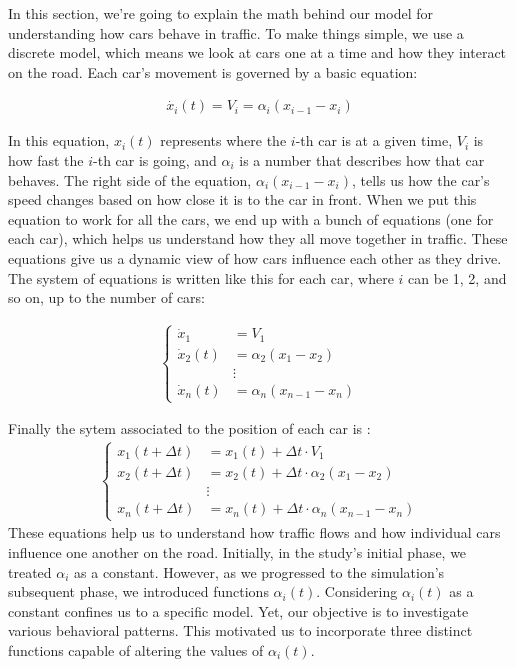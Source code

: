 \documentclass{article}
\begin{document}
			In this section, we're going to explain the math behind our model for understanding how cars behave in traffic. To make things simple, we use a discrete model, which means we look at cars one at a time and how they interact on the road. Each car's movement is governed by a basic equation:
			
			\begin{align*}
				\boxed{\dot{x_i}(t) = V_i = \alpha_i(x_{i-1} - x_i)}
			\end{align*}
			
			In this equation, \(x_i(t)\) represents where the \(i\)-th car is at a given time, \(V_i\) is how fast the \(i\)-th car is going, and \(\alpha_i\) is a number that describes how that car behaves. The right side of the equation, \(\alpha_i(x_{i-1} - x_i)\), tells us how the car's speed changes based on how close it is to the car in front. When we put this equation to work for all the cars, we end up with a bunch of equations (one for each car), which helps us understand how they all move together in traffic. These equations give us a dynamic view of how cars influence each other as they drive. The system of equations is written like this for each car, where \(i\) can be 1, 2, and so on, up to the number of cars:
			
			\begin{align*}
				\left\{
				\begin{array}{ll}
					\dot{x}_1 &= V_1 \\
					\dot{x}_2(t) &= \alpha_2(x_1 - x_2) \\
					&\vdots \\
					\dot{x}_n(t) &= \alpha_n(x_{n-1} - x_n)
				\end{array}
				\right.
			\end{align*}
			
			
			Finally the sytem associated to the position of each car is : 
			\begin{align*}
				\left\{
				\begin{array}{ll}
					x_1(t + \Delta t) &= x_1(t) + \Delta t  \cdot V_1\\
					x_2(t + \Delta t) &= x_2(t) + \Delta t  \cdot \alpha_2(x_1 - x_2) \\
					&\vdots \\
					x_n(t + \Delta t) &= x_n(t) + \Delta t \cdot  \alpha_n(x_{n-1} - x_n)
				\end{array}
				\right.
			\end{align*}
			These equations help us to understand how traffic flows and how individual cars influence one another on the road. Initially, in the study's initial phase, we treated $\alpha_i$ as a constant. However, as we progressed to the simulation's subsequent phase, we introduced functions $\alpha_i(t)$. Considering $\alpha_i(t)$ as a constant confines us to a specific model. Yet, our objective is to investigate various behavioral patterns. This motivated us to incorporate three distinct functions capable of altering the values of $\alpha_i(t)$. \newline\newline
			
\end{document}
